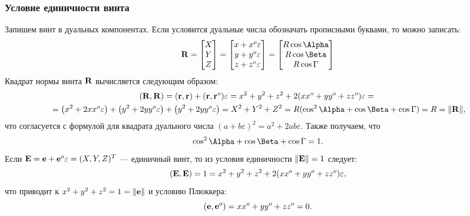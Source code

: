 \begin{frame}
  \frametitle{Условие единичности винта}
  Запишем винт в дуальных компонентах. Если условится дуальные числа обозначать прописными буквами, то можно записать:
  \begin{equation*}
    \vb{R} = 
    \begin{bmatrix}
      X\\Y\\Z
    \end{bmatrix}
    =
    \begin{bmatrix}
      x + x^o\varepsilon\\
      y + y^o\varepsilon\\
      z + z^o\varepsilon
    \end{bmatrix}
    =
    \begin{bmatrix}
      R\cos\Alpha\\
      R\cos\Beta\\
      R\cos\Gamma
    \end{bmatrix}
  \end{equation*}
  Квадрат нормы винта $\vb{R}$ вычисляется следующим образом:
  \begin{multline*}
    (\vb{R}, \vb{R}) = (\vb{r}, \vb{r}) + (\vb{r}, \vb{r}^o) \varepsilon = x^2 + y^2 + z^2 + 2(xx^o + y y^o + z z^o)\varepsilon = {} \\
    {} = \big(x^2 + 2xx^o\varepsilon\big) + \big(y^2 + 2yy^o\varepsilon\big) + \big(y^2 + 2yy^o\varepsilon\big) = X^2 + Y^2 + Z^2 = R (\cos^2\Alpha + \cos \Beta + \cos \Gamma) = R = \norm{\vb{R}},
  \end{multline*}
  что согласуется с формулой для квадрата дуального числа $(a + b\varepsilon)^2 = a^2 + 2ab\varepsilon$. Также получаем, что
  \begin{equation*}
    \cos^2\Alpha + \cos \Beta + \cos \Gamma = 1.
  \end{equation*}
  Если $\vb{E} = \vb{e} + \vb{e}^o\varepsilon = (X, Y, Z)^T$ — единичный винт, то из условия единичности $\norm{\vb{E}} = 1$ следует:
  \begin{equation*}
    (\vb{E}, \vb{E}) = 1 = x^2 + y^2 + z^2 + 2(xx^o + y y^o + z z^o)\varepsilon,
  \end{equation*}
  что приводит к $x^2 + y^2 + z^2 = 1 = \norm{\vb{e}}$ и условию Плюккера:
  \begin{equation*}
    (\vb{e}, \vb{e}^o) = xx^o + y y^o + z z^o = 0.
  \end{equation*}
\end{frame}

